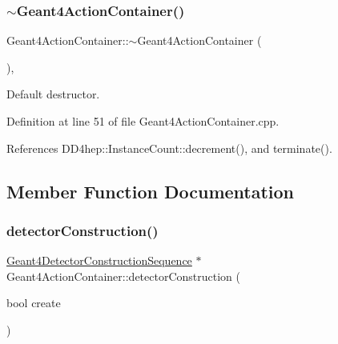 \hypertarget{class_d_d4hep_1_1_simulation_1_1_geant4_action_container_ab80f72eb6020b84e6ad03adfe9d7f61e}{}\label{class_d_d4hep_1_1_simulation_1_1_geant4_action_container_ab80f72eb6020b84e6ad03adfe9d7f61e} 
\subsubsection{\texorpdfstring{$\sim$\+Geant4\+Action\+Container()}{~Geant4ActionContainer()}}
{\footnotesize\ttfamily Geant4\+Action\+Container\+::$\sim$\+Geant4\+Action\+Container (\begin{DoxyParamCaption}{ }\end{DoxyParamCaption})\hspace{0.3cm}{\ttfamily [protected]}, {\ttfamily [virtual]}}



Default destructor. 



Definition at line 51 of file Geant4\+Action\+Container.\+cpp.



References D\+D4hep\+::\+Instance\+Count\+::decrement(), and terminate().



\subsection{Member Function Documentation}
\hypertarget{class_d_d4hep_1_1_simulation_1_1_geant4_action_container_a4dba304abe94e83eaef9c22aa196454b}{}\label{class_d_d4hep_1_1_simulation_1_1_geant4_action_container_a4dba304abe94e83eaef9c22aa196454b} 
\subsubsection{\texorpdfstring{detector\+Construction()}{detectorConstruction()}\hspace{0.1cm}{\footnotesize\ttfamily [1/2]}}
{\footnotesize\ttfamily \hyperlink{class_d_d4hep_1_1_simulation_1_1_geant4_detector_construction_sequence}{Geant4\+Detector\+Construction\+Sequence} $\ast$ Geant4\+Action\+Container\+::detector\+Construction (\begin{DoxyParamCaption}\item[{bool}]{create }\end{DoxyParamCaption})}



